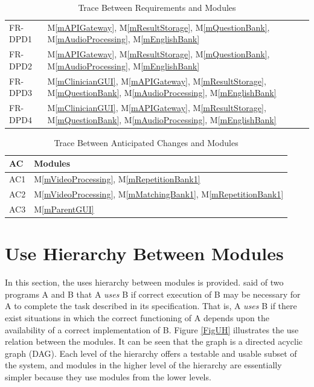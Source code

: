 \documentclass[12pt, titlepage]{article}
\newcommand{\mref}[1]{M\ref{#1}}
\begin{document}
\begin{table}[H]
\begin{tabular}{p{} p{}}
  FR-DPD1 & \mref{mAPIGateway}, \mref{mResultStorage}, \mref{mQuestionBank},
            \mref{mAudioProcessing}, \mref{mEnglishBank}\\
  FR-DPD2 & \mref{mAPIGateway}, \mref{mResultStorage}, \mref{mQuestionBank},
            \mref{mAudioProcessing}, \mref{mEnglishBank}\\
  FR-DPD3 & \mref{mClinicianGUI}, \mref{mAPIGateway}, \mref{mResultStorage},
            \mref{mQuestionBank}, \mref{mAudioProcessing}, \mref{mEnglishBank}\\
  FR-DPD4 & \mref{mClinicianGUI}, \mref{mAPIGateway}, \mref{mResultStorage},
            \mref{mQuestionBank}, \mref{mAudioProcessing}, \mref{mEnglishBank}\\
  
  \bottomrule
  \end{tabular}
  \caption{Trace Between Requirements and Modules}
  \label{TblRT}
  \end{table}
  
  

\begin{table}[H]
\centering
\begin{tabular}{p{} p{}}
\toprule
\textbf{AC} & \textbf{Modules}\\
\midrule
AC1 & \mref{mVideoProcessing}, \mref{mRepetitionBank1} \\
AC2 & \mref{mVideoProcessing}, \mref{mMatchingBank1}, \mref{mRepetitionBank1} \\
AC3 & \mref{mParentGUI}\\
\end{tabular}
\caption{Trace Between Anticipated Changes and Modules}
\label{TblACT}
\end{table}


\section{Use Hierarchy Between Modules} \label{SecUse}

In this section, the uses hierarchy between modules is
provided. \citet{Parnas1978} said of two programs A and B that A {\em uses} B if
correct execution of B may be necessary for A to complete the task described in
its specification. That is, A {\em uses} B if there exist situations in which
the correct functioning of A depends upon the availability of a correct
implementation of B.  Figure \ref{FigUH} illustrates the use relation between
the modules. It can be seen that the graph is a directed acyclic graph
(DAG). Each level of the hierarchy offers a testable and usable subset of the
system, and modules in the higher level of the hierarchy are essentially simpler
because they use modules from the lower levels.
\end{document}
